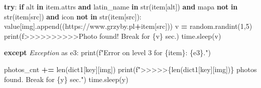 \documentclass[
]{article}
\newenvironment{Shaded}{\begin{snugshade}}{\end{snugshade}}
\newcommand{\BuiltInTok}[1]{#1}
\newcommand{\ControlFlowTok}[1]{\textcolor[rgb]{0.13,0.29,0.53}{\textbf{#1}}}
\newcommand{\DecValTok}[1]{\textcolor[rgb]{0.00,0.00,0.81}{#1}}
\newcommand{\ImportTok}[1]{#1}
\newcommand{\KeywordTok}[1]{\textcolor[rgb]{0.13,0.29,0.53}{\textbf{#1}}}
\newcommand{\NormalTok}[1]{#1}
\newcommand{\OperatorTok}[1]{\textcolor[rgb]{0.81,0.36,0.00}{\textbf{#1}}}
\newcommand{\PreprocessorTok}[1]{\textcolor[rgb]{0.56,0.35,0.01}{\textit{#1}}}
\newcommand{\SpecialCharTok}[1]{\textcolor[rgb]{0.00,0.00,0.00}{#1}}
\newcommand{\SpecialStringTok}[1]{\textcolor[rgb]{0.31,0.60,0.02}{#1}}
\newcommand{\StringTok}[1]{\textcolor[rgb]{0.31,0.60,0.02}{#1}}
\begin{document}
\begin{Shaded}
\begin{Highlighting}[]
                        \ControlFlowTok{try}\NormalTok{:}
                            \ControlFlowTok{if} \StringTok{\textquotesingle{}alt\textquotesingle{}} \KeywordTok{in}\NormalTok{ item.attrs }\KeywordTok{and}\NormalTok{ latin\_name }\KeywordTok{in} \BuiltInTok{str}\NormalTok{(item[}\StringTok{\textquotesingle{}alt\textquotesingle{}}\NormalTok{]) }\KeywordTok{and} \StringTok{\textquotesingle{}mapa\textquotesingle{}} \KeywordTok{not} \KeywordTok{in} \BuiltInTok{str}\NormalTok{(item[}\StringTok{\textquotesingle{}src\textquotesingle{}}\NormalTok{]) }\KeywordTok{and} \StringTok{\textquotesingle{}icon\textquotesingle{}} \KeywordTok{not} \KeywordTok{in} \BuiltInTok{str}\NormalTok{(item[}\StringTok{\textquotesingle{}src\textquotesingle{}}\NormalTok{]):}
\NormalTok{                                value[}\StringTok{\textquotesingle{}img\textquotesingle{}}\NormalTok{].append((}\StringTok{\textquotesingle{}https://www.grzyby.pl\textquotesingle{}}\OperatorTok{+}\NormalTok{item[}\StringTok{\textquotesingle{}src\textquotesingle{}}\NormalTok{]))}
\NormalTok{                                v }\OperatorTok{=}\NormalTok{ random.randint(}\DecValTok{1}\NormalTok{,}\DecValTok{5}\NormalTok{)}
                                \BuiltInTok{print}\NormalTok{(}\SpecialStringTok{f\textquotesingle{}\textgreater{}\textgreater{}\textgreater{}\textgreater{}\textgreater{}\textgreater{}\textgreater{}\textgreater{}\textgreater{}\textgreater{}Photo found! Break for }\SpecialCharTok{\{}\NormalTok{v}\SpecialCharTok{\}}\SpecialStringTok{ sec.\textquotesingle{}}\NormalTok{)}
\NormalTok{                                time.sleep(v)}

                        \ControlFlowTok{except} \PreprocessorTok{Exception} \ImportTok{as}\NormalTok{ e3:}
                            \BuiltInTok{print}\NormalTok{(}\SpecialStringTok{f"Error on level 3 for }\SpecialCharTok{\{}\NormalTok{item}\SpecialCharTok{\}}\SpecialStringTok{: }\SpecialCharTok{\{}\NormalTok{e3}\SpecialCharTok{\}}\SpecialStringTok{."}\NormalTok{)}

\NormalTok{                    photos\_cnt }\OperatorTok{+=} \BuiltInTok{len}\NormalTok{(dict1[key][}\StringTok{\textquotesingle{}img\textquotesingle{}}\NormalTok{])}
                    \BuiltInTok{print}\NormalTok{(}\SpecialStringTok{f"\textgreater{}\textgreater{}\textgreater{}\textgreater{}\textgreater{}}\SpecialCharTok{\{}\BuiltInTok{len}\NormalTok{(dict1[key][}\StringTok{\textquotesingle{}img\textquotesingle{}}\NormalTok{])}\SpecialCharTok{\}}\SpecialStringTok{ photos found. Break for }\SpecialCharTok{\{}\NormalTok{y}\SpecialCharTok{\}}\SpecialStringTok{ sec."}\NormalTok{)}
\NormalTok{                    time.sleep(y)}


\end{Highlighting}
\end{Shaded}
\end{document}
